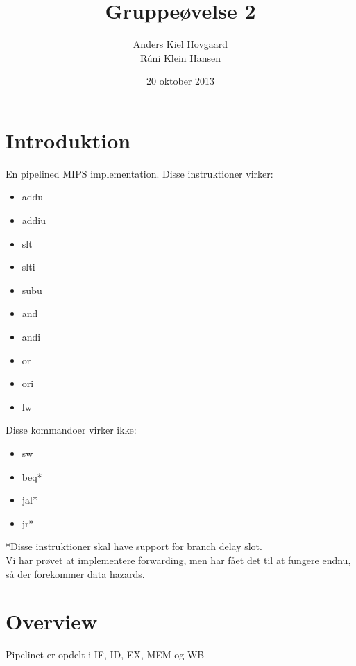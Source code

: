 \documentclass[12pt,a4paper,danish]{article}
\begin{document}
\title{Gruppeøvelse 2}
\author{Anders Kiel Hovgaard\\Rúni Klein Hansen}
\date{20 oktober 2013}
\maketitle

\section{Introduktion}
En pipelined MIPS implementation. Disse instruktioner virker:
\begin{itemize}
  \item addu
  \item addiu
  \item slt
  \item slti
  \item subu
  \item and
  \item andi
  \item or
  \item ori
  \item lw
\end{itemize}

Disse kommandoer virker ikke:
\begin{itemize}
  \item sw
  \item beq*
  \item jal*
  \item jr*
\end{itemize}
*Disse instruktioner skal have support for branch delay slot.\\

Vi har prøvet at implementere forwarding, men har fået det til at fungere endnu, 
så der forekommer data hazards.

\section{Overview}
Pipelinet er opdelt i IF, ID, EX, MEM og WB
\end{document}
